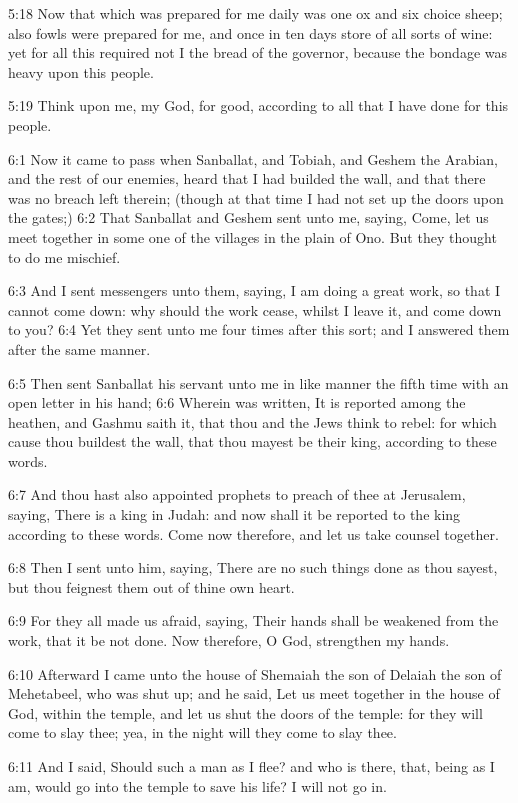 5:18 Now that which was prepared for me daily was one ox and six
choice sheep; also fowls were prepared for me, and once in ten days
store of all sorts of wine: yet for all this required not I the bread
of the governor, because the bondage was heavy upon this people.

5:19 Think upon me, my God, for good, according to all that I have
done for this people.

6:1 Now it came to pass when Sanballat, and Tobiah, and Geshem the
Arabian, and the rest of our enemies, heard that I had builded the
wall, and that there was no breach left therein; (though at that time
I had not set up the doors upon the gates;) 6:2 That Sanballat and
Geshem sent unto me, saying, Come, let us meet together in some one of
the villages in the plain of Ono. But they thought to do me mischief.

6:3 And I sent messengers unto them, saying, I am doing a great work,
so that I cannot come down: why should the work cease, whilst I leave
it, and come down to you?  6:4 Yet they sent unto me four times after
this sort; and I answered them after the same manner.

6:5 Then sent Sanballat his servant unto me in like manner the fifth
time with an open letter in his hand; 6:6 Wherein was written, It is
reported among the heathen, and Gashmu saith it, that thou and the
Jews think to rebel: for which cause thou buildest the wall, that thou
mayest be their king, according to these words.

6:7 And thou hast also appointed prophets to preach of thee at
Jerusalem, saying, There is a king in Judah: and now shall it be
reported to the king according to these words. Come now therefore, and
let us take counsel together.

6:8 Then I sent unto him, saying, There are no such things done as
thou sayest, but thou feignest them out of thine own heart.

6:9 For they all made us afraid, saying, Their hands shall be weakened
from the work, that it be not done. Now therefore, O God, strengthen
my hands.

6:10 Afterward I came unto the house of Shemaiah the son of Delaiah
the son of Mehetabeel, who was shut up; and he said, Let us meet
together in the house of God, within the temple, and let us shut the
doors of the temple: for they will come to slay thee; yea, in the
night will they come to slay thee.

6:11 And I said, Should such a man as I flee? and who is there, that,
being as I am, would go into the temple to save his life? I will not
go in.

